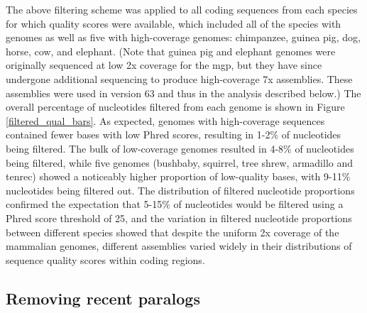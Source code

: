 The above filtering scheme was applied to all coding sequences from
each species for which quality scores were available, which included
all of the species with \lcv genomes as well as five with
high-coverage genomes: chimpanzee, guinea pig, dog, horse, cow, and
elephant. (Note that guinea pig and elephant genomes were originally
sequenced at low 2x coverage for the \ac{mgp}, but they have since
undergone additional sequencing to produce high-coverage 7x
assemblies. These assemblies were used in \ens version 63 and thus in
the analysis described below.) The overall percentage of nucleotides
filtered from each genome is shown in Figure
\ref{filtered_qual_bars}. As expected, genomes with high-coverage
sequences contained fewer bases with low Phred scores, resulting in
1-2\% of nucleotides being filtered. The bulk of low-coverage genomes
resulted in 4-8\% of nucleotides being filtered, while five genomes
(bushbaby, squirrel, tree shrew, armadillo and tenrec) showed a
noticeably higher proportion of low-quality bases, with 9-11\%
nucleotides being filtered out. The distribution of filtered
nucleotide proportions confirmed the expectation that 5-15\% of
nucleotides would be filtered using a Phred score threshold of 25, and
the variation in filtered nucleotide proportions between different
species showed that despite the uniform 2x coverage of the \lcv
mammalian genomes, different assemblies varied widely in their
distributions of sequence quality scores within coding regions.

\subsection{Removing recent paralogs}
\label{section_removing_paralogs}

